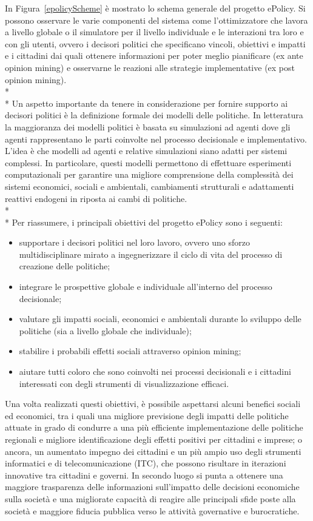 \documentclass[12pt,a4paper,openright,twoside]{report}
\begin{document}
In Figura~\ref{epolicyScheme} è mostrato lo schema generale del progetto ePolicy. Si possono osservare le varie componenti del sistema come l'ottimizzatore che lavora a livello globale o il simulatore per il livello individuale e le interazioni tra loro e con gli utenti, ovvero i decisori politici che specificano vincoli, obiettivi e impatti e i cittadini dai quali ottenere informazioni per poter meglio pianificare (ex ante opinion mining) e osservarne le reazioni alle strategie implementative (ex post opinion mining).\\*\\*
Un aspetto importante da tenere in considerazione per fornire supporto ai decisori politici è la definizione formale dei modelli delle politiche. In letteratura la maggioranza dei modelli politici è basata su simulazioni ad agenti \cite{AgentBaseLandUseModel,Nigel,socialScienceMicrosim} dove gli agenti rappresentano le parti coinvolte nel processo decisionale e implementativo. L'idea è che modelli ad agenti e relative simulazioni siano adatti per sistemi complessi. In particolare, questi modelli permettono di effettuare esperimenti computazionali per garantire una migliore comprensione della complessità dei sistemi economici, sociali e ambientali, cambiamenti strutturali e adattamenti reattivi endogeni in riposta ai cambi di politiche.
\\*\\*
Per riassumere, i principali obiettivi del progetto ePolicy sono i seguenti:
\begin{itemize}
\item supportare i decisori politici nel loro lavoro, ovvero uno sforzo multidisciplinare mirato a ingegnerizzare il ciclo di vita del processo di creazione delle politiche;
\item integrare le prospettive globale e individuale all'interno del processo decisionale;
\item valutare gli impatti sociali, economici e ambientali durante lo sviluppo delle politiche (sia a livello globale che individuale);
\item stabilire i probabili effetti sociali attraverso opinion mining;
\item aiutare tutti coloro che sono coinvolti nei processi decisionali e i cittadini interessati con degli strumenti di visualizzazione efficaci.
\end{itemize}
Una volta realizzati questi obiettivi, è possibile aspettarsi alcuni benefici sociali ed economici, tra i quali una migliore previsione degli impatti delle politiche attuate in grado di condurre a una più efficiente implementazione delle politiche regionali e migliore identificazione degli effetti positivi per cittadini e imprese; o ancora, un aumentato impegno dei cittadini e un più ampio uso degli strumenti informatici e di telecomunicazione (ITC), che possono risultare in iterazioni innovative tra cittadini e governi. In secondo luogo si punta a ottenere una maggiore trasparenza delle informazioni sull'impatto delle decisioni economiche sulla società e una migliorate capacità di reagire alle principali sfide poste alla società e maggiore fiducia pubblica verso le attività governative e burocratiche.
\end{document}
